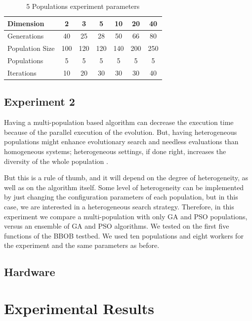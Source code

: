 \documentclass[review]{elsarticle}
\begin{document}
\begin{table}
    \small
    \caption{5 Populations experiment parameters
    }
    \label{tab:params:5}
    \centering
    \small
    \begin{tabular}{|l|c|c|c|c|c|c|}
      \hline
      Dimension        & 2  & 3  & 5  & 10 & 20  & 40  \\ \hline
      Generations      & 40 & 25 & 28 & 50 & 66  & 80  \\ \hline
      Population Size  & 100 & 120 & 120 & 140 & 200 & 250 \\ \hline
      Populations      & 5 & 5 & 5 & 5 & 5  & 5  \\ \hline
      Iterations       & 10 & 20 & 30 & 30 & 30  & 40  \\ \hline  
    \end{tabular}
\end{table}

% 

\subsection{Experiment 2}
\label{sec:exp2}

Having a multi-population based algorithm can decrease the execution time
because of the parallel execution of the evolution. But, having heterogeneous 
populations might enhance evolutionary search and needless
evaluations than homogeneous systems; heterogeneous settings, if
done right, increases the diversity of the whole population
\cite{araujo2008multikulti}.

But this is a rule of thumb, and it will depend on the degree of heterogeneity,
as well as on the algorithm itself. Some level of heterogeneity can be
implemented by just changing the configuration parameters of each population,
but in this case, we are interested in a heterogeneous search strategy. 
Therefore, in this experiment we compare a multi-population with only GA and PSO populations,
versus an ensemble of GA and PSO algorithms. We tested on the first five functions of the
BBOB testbed. We used ten populations and eight workers for the experiment and the
same parameters as before.  

\subsection{Hardware}
\label{sec:hardware}


\section{Experimental Results} 
\label{results}
\end{document}
